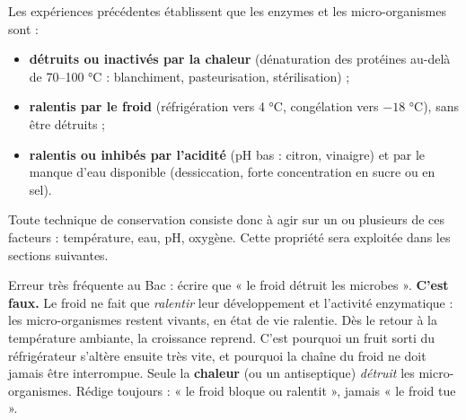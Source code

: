 \documentclass[11pt]{article}
\newcommand{\cle}[1]{{\popxbold\color{popdark}#1}}
\begin{document}
\begin{propriete}
Les expériences précédentes établissent que les \cle{enzymes} et les \cle{micro-organismes} sont :
\begin{itemize}
\item \textbf{détruits ou inactivés par la chaleur} (dénaturation des protéines au-delà de 70--100 \si{\celsius} : blanchiment, pasteurisation, stérilisation) ;
\item \textbf{ralentis par le froid} (réfrigération vers 4 \si{\celsius}, congélation vers $-18$ \si{\celsius}), sans être détruits ;
\item \textbf{ralentis ou inhibés par l'acidité} (pH bas : citron, vinaigre) et par le manque d'eau disponible (dessiccation, forte concentration en sucre ou en sel).
\end{itemize}
Toute technique de conservation consiste donc à agir sur un ou plusieurs de ces facteurs : température, eau, pH, oxygène. Cette propriété sera exploitée dans les sections suivantes.
\end{propriete}

\begin{attention}
Erreur très fréquente au Bac : écrire que « le froid détruit les microbes ». \textbf{C'est faux.} Le froid ne fait que \emph{ralentir} leur développement et l'activité enzymatique : les micro-organismes restent vivants, en état de vie ralentie. Dès le retour à la température ambiante, la croissance reprend. C'est pourquoi un fruit sorti du réfrigérateur s'altère ensuite très vite, et pourquoi la chaîne du froid ne doit jamais être interrompue. Seule la \textbf{chaleur} (ou un antiseptique) \emph{détruit} les micro-organismes. Rédige toujours : « le froid bloque ou ralentit », jamais « le froid tue ».
\end{attention}
\end{document}
